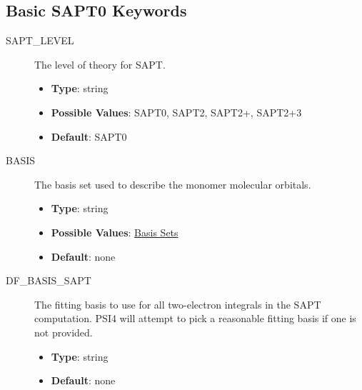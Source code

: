 \documentclass[letterpaper,10pt,english]{sphinxmanual}
\begin{document}
\subsection{Basic SAPT0 Keywords}
\label{index:basic-sapt0-keywords}\begin{description}
\item[{SAPT\_LEVEL}] \leavevmode{}\label{index:term-sapt-level}
The level of theory for SAPT.
\begin{itemize}
\item {} 
\textbf{Type}: string

\item {} 
\textbf{Possible Values}: SAPT0, SAPT2, SAPT2+, SAPT2+3

\item {} 
\textbf{Default}: SAPT0

\end{itemize}

\end{description}
\begin{description}
\item[{BASIS}] \leavevmode{}\label{index:term-basis}
The basis set used to describe the monomer molecular orbitals.
\begin{itemize}
\item {} 
\textbf{Type}: string

\item {} 
\textbf{Possible Values}: \href{http://sirius.chem.vt.edu/trac/wiki/InstalledBasisSets}{Basis Sets}

\item {} 
\textbf{Default}: none

\end{itemize}

\end{description}
\begin{description}
\item[{DF\_BASIS\_SAPT}] \leavevmode{}\label{index:term-df-basis-sapt}
The fitting basis to use for all two-electron integrals
in the SAPT computation. PSI4 will attempt to pick
a reasonable fitting basis if one is not provided.
\begin{itemize}
\item {} 
\textbf{Type}: string

\item {} 
\textbf{Default}: none

\end{itemize}

\end{description}
\end{document}
